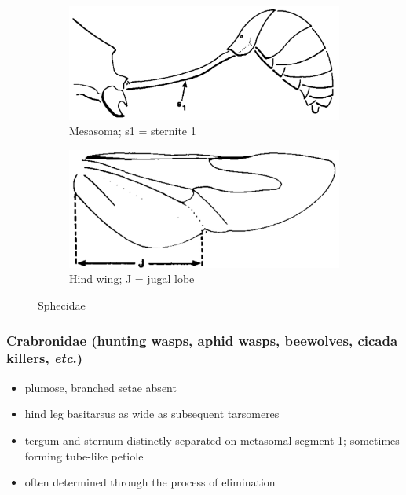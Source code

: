 \documentclass[letterpaper, 11pt]{article}
\begin{document}
\begin{figure}[ht!]
    \centering
    \begin{subfigure}[ht!]{0.45\textwidth}
        \includegraphics[width=\textwidth]{SphecidMetasoma}
        \caption{Mesasoma; s1 = sternite 1}
        \label{fig:sphecid1}
    \end{subfigure}
    \qquad
    \begin{subfigure}[ht!]{0.45\textwidth}
        \includegraphics[width=\textwidth]{SphecidWing}
        \caption{Hind wing; J = jugal lobe}
        \label{fig:sphecid2}
    \end{subfigure}
    \caption{Sphecidae \citep[][pg. 281]{goulet1993hymenoptera}}\label{fig:sphecids}
\end{figure}

\subsubsection{Crabronidae (hunting wasps, aphid wasps, beewolves, cicada killers, \textit{etc}.)}
\begin{itemize}
\item plumose, branched setae absent
\item hind leg basitarsus as wide as subsequent tarsomeres 
\item tergum and sternum distinctly separated on metasomal segment 1; sometimes forming tube-like petiole
\item often determined through the process of elimination
\end{itemize}
\end{document}
